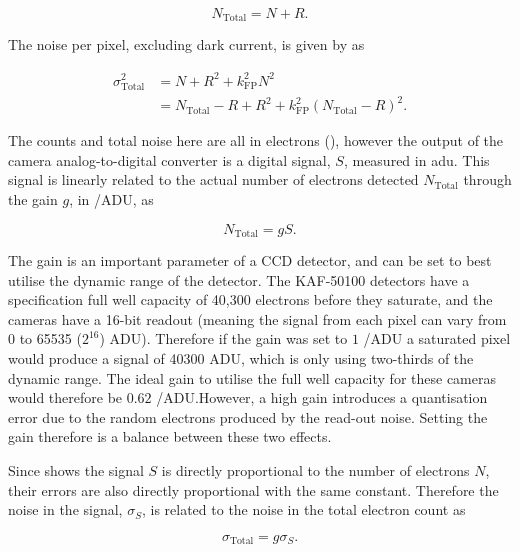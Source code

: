 \begin{colsection}
\begin{colsection}
\begin{equation}
    N_\text{Total} = N + R.
    \label{eq:total_count}
\end{equation}

The noise per pixel, excluding dark current, is given by  as

\begin{equation}
    \begin{split}
        \sigma_\text{Total}^2 & = N + R^2 + k_\text{FP}^2 N^2 \\
                              & = N_\text{Total} - R + R^2 + k_\text{FP}^2{(N_\text{Total} - R)}^2.
    \end{split}
    \label{eq:ptc_noise1}
\end{equation}

The counts and total noise here are all in electrons (\elec), however the output of the camera analog-to-digital converter is a digital signal, $S$, measured in \gls{adu}. This signal is linearly related to the actual number of electrons detected $N_\text{Total}$ through the gain $g$, in \elec/ADU, as

\begin{equation}
    N_\text{Total} = g S.
    \label{eq:gain}
\end{equation}

The gain is an important parameter of a CCD detector, and can be set to best utilise the dynamic range of the detector. The KAF-50100 detectors have a specification full well capacity of 40,300 electrons before they saturate, and the cameras have a 16-bit readout (meaning the signal from each pixel can vary from 0 to 65535 ($2^{16}$) ADU). Therefore if the gain was set to $1$ \elec/ADU a saturated pixel would produce a signal of 40300 ADU, which is only using two-thirds of the dynamic range. The ideal gain to utilise the full well capacity for these cameras would therefore be $0.62$ \elec/ADU.\@ However, a high gain introduces a quantisation error due to the random electrons produced by the read-out noise. Setting the gain therefore is a balance between these two effects.

Since  shows the signal $S$ is directly proportional to the number of electrons $N$, their errors are also directly proportional with the same constant. Therefore the noise in the signal, $\sigma_S$, is related to the noise in the total electron count as

\begin{equation}
    \sigma_\text{Total} = g \sigma_S.
    \label{eq:noise_gain}
\end{equation}


\end{colsection}
\end{colsection}
